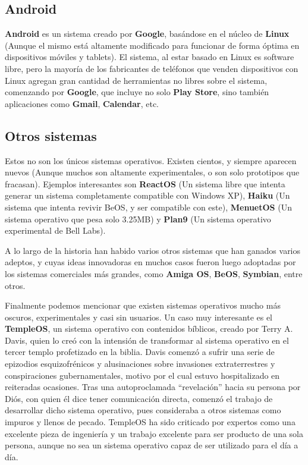 \subsection*{Android}

\textbf{Android} es un sistema creado por \textbf{Google}, basándose en el
núcleo de \textbf{Linux} (Aunque el mismo está altamente modificado para
funcionar de forma óptima en dispositivos móviles y tablets). El sistema, al
estar basado en Linux es software libre, pero la mayoría de los fabricantes de
teléfonos que venden dispositivos con Linux agregan gran cantidad de
herramientas no libres sobre el sistema, comenzando por \textbf{Google}, que
incluye no solo \textbf{Play Store}, sino también aplicaciones como
\textbf{Gmail}, \textbf{Calendar}, etc.

\subsection*{Otros sistemas}

Estos no son los únicos sistemas operativos. Existen cientos, y siempre aparecen
nuevos (Aunque muchos son altamente experimentales, o son solo prototipos que
fracasan). Ejemplos interesantes son \textbf{ReactOS} (Un sistema libre que
intenta generar un sistema completamente compatible con Windows XP),
\textbf{Haiku} (Un sistema que intenta revivir BeOS, y ser compatible con este),
\textbf{MenuetOS} (Un sistema operativo que pesa solo 3.25MB) y \textbf{Plan9}
(Un sistema operativo experimental de Bell Labs).

A lo largo de la historia han habido varios otros sistemas que han ganados
varios adeptos, y cuyas ideas innovadoras en muchos casos fueron luego adoptadas
por los sistemas comerciales más grandes, como \textbf{Amiga OS}, \textbf{BeOS},
\textbf{Symbian}, entre otros.

Finalmente podemos mencionar que existen sistemas operativos mucho más oscuros,
experimentales y casi sin usuarios. Un caso muy interesante es el
\textbf{TempleOS}, un sistema operativo con contenidos bíblicos, creado por
Terry A. Davis, quien lo creó con la intensión de transformar al sistema
operativo en el tercer templo profetizado en la biblia. Davis comenzó a sufrir
una serie de epizodios esquizofrénicos y alusinaciones sobre invasiones
extraterrestres y conspiraciones gubernamentales, motivo por el cual estuvo
hospitalizado en reiteradas ocasiones. Tras una autoproclamada ``revelación''
hacia su persona por Diós, con quien él dice tener comunicación directa, comenzó
el trabajo de desarrollar dicho sistema operativo, pues consideraba a otros
sistemas como impuros y llenos de pecado. TempleOS ha sido criticado por
expertos como una excelente pieza de ingeniería y un trabajo excelente para ser
producto de una sola persona, aunque no sea un sistema operativo capaz de ser
utilizado para el día a día.
\vspace{1cm}

